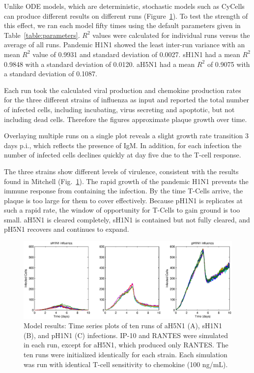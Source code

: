 \documentclass[10pt]{article}
\begin{document}
Unlike ODE models, which are deterministic, stochastic models such as CyCells can produce different results on different runs (Figure~\ref{fig:variance}).  To test the strength of this effect, we ran each model fifty times using the default parameters given in Table~\ref{table:parameters}.  $R^2$ values were calculated for individual runs versus the average of all runs.  Pandemic H1N1 showed the least inter-run variance with an mean $R^2$ value of 0.9931 and standard deviation of 0.0027.  sH1N1 had a mean $R^2$ 0.9848 with a standard deviation of 0.0120.  aH5N1 had a mean $R^2$ of 0.9075 with a standard deviation of 0.1087.  

Each run took the calculated viral production and chemokine production rates for the three different strains of influenza as input and reported the total number of infected cells, including incubating, virus secreting and apoptotic, but not including dead cells.  Therefore the figures approximate plaque growth over time.

Overlaying multiple runs on a single plot reveals a slight growth rate transition 3 days p.i., which reflects the presence of IgM.  In addition, for each infection the number of infected cells declines quickly at day five due to the T-cell response. 

The three strains show different levels of virulence, consistent with the results found in Mitchell (Fig.~\ref{fig:variance}).  The rapid growth of the pandemic H1N1 prevents the immune response from containing the infection.  By the time T-Cells arrive, the plaque is too large for them to cover effectively.  Because pH1N1 is replicates at such a rapid rate, the window of opportunity for T-Cells to gain ground is too small.  aH5N1 is cleared completely, sH1N1 is contained but not fully cleared, and pH5N1 recovers and continues to expand.

\begin{figure}[ht!]
\begin{center}
 \includegraphics[width=\textwidth]{variance}
 \end{center}
\caption{Model results: Time series plots of ten runs of aH5N1 (A), sH1N1 (B), and pH1N1 (C) infections. IP-10 and RANTES were simulated in each run, except for aH5N1, which  produced only RANTES.  The ten runs were initialized identically for each strain.  Each simulation was run with identical T-cell sensitivity to chemokine (100 ng/mL).} 
 \label{fig:variance}
\end{figure}
\end{document}
